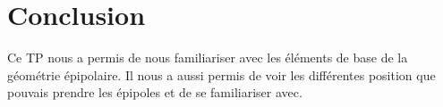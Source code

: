 \documentclass[12pt]{report}
\begin{document}
\section{Conclusion}

Ce TP nous a permis de nous familiariser avec les éléments de base de la géométrie épipolaire. Il nous a aussi permis de voir les différentes position que pouvais prendre les épipoles et de se familiariser avec. 

\newpage



\renewcommand*\listfigurename{\large Liste des figures}
\listoffigures
\newpage
\end{document}
